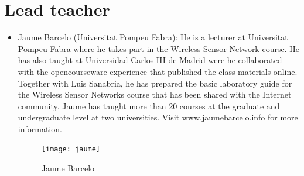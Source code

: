 \documentclass[a4paper,oneside]{book}   %
\begin{document}
\section{Lead teacher}
\begin{itemize}
\item Jaume Barcelo (Universitat Pompeu Fabra): He is a lecturer at Universitat Pompeu Fabra where he takes part in the Wireless Sensor Network course. He has also taught at Universidad Carlos III de Madrid were he collaborated with the opencourseware experience that published the class materials online. Together with Luis Sanabria, he has prepared the basic laboratory guide for the Wireless Sensor Networks course that has been shared with the Internet community. Jaume has taught more than 20 courses at the graduate and undergraduate level at two universities. Visit www.jaumebarcelo.info for more information.
\begin{figure}
\begin{center}
\texttt{[image: jaume]}
\caption{Jaume Barcelo}
\label{fig:jaume}
\end{center}
\end{figure}
\end{itemize}
\end{document}
